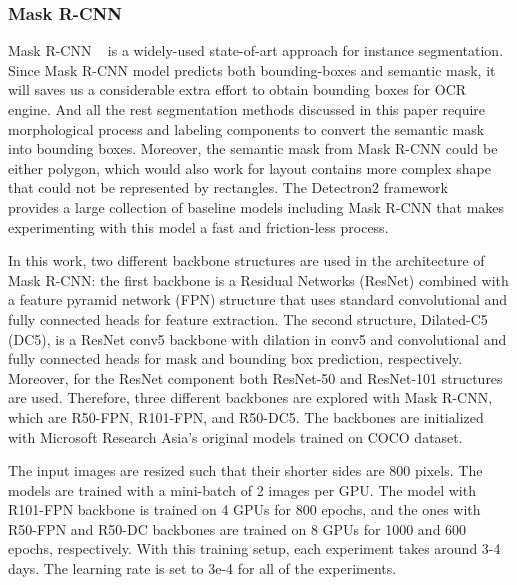 \documentclass[letterpaper]{article} %
\begin{document}
\subsubsection{Mask R-CNN}
Mask R-CNN ~\cite{DBLP:conf/iccv/HeGDG17} is a widely-used state-of-art approach for instance segmentation. Since Mask R-CNN model predicts both bounding-boxes and semantic mask, it will saves us a considerable extra effort to obtain bounding boxes for OCR engine. And all the rest segmentation methods discussed in this paper require morphological process and labeling components to convert the semantic mask into bounding boxes. Moreover, the semantic mask from Mask R-CNN could be either polygon, which would also work for layout contains more complex shape that could not be represented by rectangles.
The Detectron2 framework ~\cite{wu2019detectron2} provides a large collection of baseline models including Mask R-CNN that makes experimenting with this model a fast and friction-less process.

In this work, two different backbone structures are used in the architecture of Mask R-CNN: the first backbone is a Residual Networks (ResNet) combined with a feature pyramid network (FPN) structure that uses standard convolutional and fully connected heads for feature extraction. The second structure, Dilated-C5 (DC5), is a ResNet conv5 backbone with dilation in conv5 and convolutional and fully connected heads for mask and bounding box prediction, respectively.
Moreover, for the ResNet component both ResNet-50 and ResNet-101 structures are used. Therefore, three different backbones are explored with Mask R-CNN, 
which are R50-FPN, R101-FPN, and R50-DC5. The backbones are initialized with Microsoft Research Asia's original models trained on COCO \cite{DBLP:conf/eccv/LinMBHPRDZ14} dataset. 

The input images are resized such that their shorter sides are 800 pixels. The models are trained with a mini-batch of 2 images per GPU. The model with R101-FPN backbone is trained on 4 GPUs for 800 epochs, and the ones with R50-FPN and R50-DC backbones are trained on 8 GPUs for 1000 and 600 epochs, respectively. With this training setup, each experiment takes around 3-4 days. The learning rate is set to 3e-4 for all of the experiments. 
\end{document}

